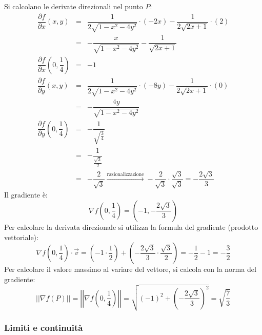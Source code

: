 \documentclass[a4paper]{article}
\begin{document}
	\noindent
	Si calcolano le derivate direzionali nel punto $P$:
	\begin{equation*}
		\begin{array}{rcl}
			\dfrac{\partial f}{\partial x}\left(x,y\right) &=& \dfrac{1}{2\sqrt{1-x^{2}-4y^{2}}} \cdot \left(-2x\right) - \dfrac{1}{2\sqrt{2x+1}} \cdot \left(2\right) \\ [1.5em]
			&=& -\dfrac{x}{\sqrt{1-x^{2}-4y^{2}}} - \dfrac{1}{\sqrt{2x+1}} \\ [1em]
			\dfrac{\partial f}{\partial x}\left(0,\dfrac{1}{4}\right) &=& -1 \\ [2em]
			\dfrac{\partial f}{\partial y}\left(x,y\right) &=& \dfrac{1}{2\sqrt{1-x^{2}-4y^{2}}} \cdot \left(-8y\right) - \dfrac{1}{2\sqrt{2x+1}} \cdot \left(0\right) \\ [1.5em]
			&=& -\dfrac{4y}{\sqrt{1-x^{2}-4y^{2}}} \\ [1em]
			\dfrac{\partial f}{\partial y}\left(0,\dfrac{1}{4}\right) &=& -\dfrac{1}{\sqrt{\frac{3}{4}}} \\ [2.5em]
			&=& - \dfrac{1}{\frac{\sqrt{3}}{2}} \\ [2em]
			&=& - \dfrac{2}{\sqrt{3}} \xrightarrow{\text{razionalizzazione}} - \dfrac{2}{\sqrt{3}} \cdot \dfrac{\sqrt{3}}{\sqrt{3}}  = -\dfrac{2\sqrt{3}}{3}
		\end{array}
	\end{equation*}
	Il gradiente è:
	\begin{equation*}
		\nabla f\left(0,\dfrac{1}{4}\right) = \left(-1, -\dfrac{2\sqrt{3}}{3}\right)
	\end{equation*}
	Per calcolare la derivata direzionale si utilizza la formula del gradiente (prodotto vettoriale):
	\begin{equation*}
		\nabla f\left(0,\dfrac{1}{4}\right) \cdot \overrightarrow{v} = \left(-1 \cdot \dfrac{1}{2}\right) + \left(-\dfrac{2\sqrt{3}}{3} \cdot \dfrac{\sqrt{3}}{2}\right) = -\dfrac{1}{2} - 1 = -\dfrac{3}{2}
	\end{equation*}
	Per calcolare il valore massimo al variare del vettore, si calcola con la norma del gradiente:
	\begin{equation*}
		\left|\left| \nabla f\left(P\right) \right|\right| = \left|\left| \nabla f\left(0,\dfrac{1}{4}\right) \right|\right| = \sqrt{\left(-1\right)^{2} + \left(-\dfrac{2\sqrt{3}}{3}\right)^{2}} = \sqrt{\dfrac{7}{3}}
	\end{equation*}\newpage

	\subsubsection{Limiti e continuità}
\end{document}
